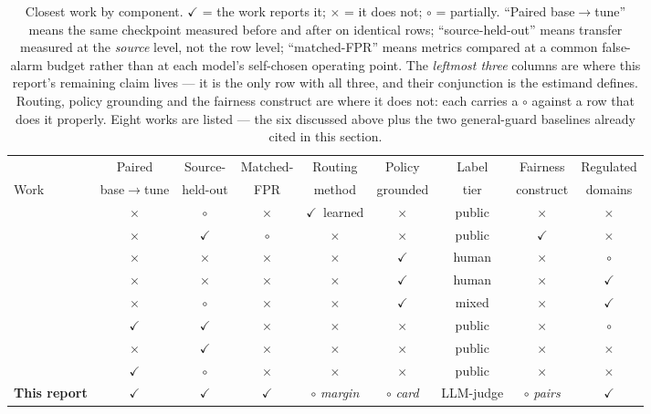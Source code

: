 \documentclass[11pt]{article}
\newcommand{\cmark}{\textcolor{tkgreenedge}{\ensuremath{\checkmark}}}
\newcommand{\xmark}{\textcolor{black!45}{\ensuremath{\times}}}
\begin{document}
\begin{table}[htbp]\centering\scriptsize
\caption{Closest work by component. \cmark{} = the work reports it; \xmark{} = it does not;
$\circ$ = partially. ``Paired base$\to$tune'' means the same checkpoint measured before and after on
identical rows; ``source-held-out'' means transfer measured at the \emph{source} level, not the row
level; ``matched-FPR'' means metrics compared at a common false-alarm budget rather than at each
model's self-chosen operating point. The \emph{leftmost three} columns are where this report's
remaining claim lives --- it is the only row with all three, and their conjunction is the estimand
 defines. Routing, policy grounding and the fairness construct are where it does not:
each carries a $\circ$ against a row that does it properly. Eight works are listed --- the six
discussed above plus the two general-guard baselines already cited in this section.}
\label{tab:closest}
\setlength{\tabcolsep}{3.2pt}\renewcommand{\arraystretch}{1.12}
\begin{tabular}{@{}>{\raggedright\arraybackslash}p{}cccccccc@{}}
\toprule
& Paired & Source- & Matched- & Routing & Policy & Label & Fairness & Regulated \\
Work & base$\to$tune & held-out & FPR & method & grounded & tier & construct & domains \\
\midrule
\citet{lee2025saferoute} & \xmark & $\circ$ & \xmark & \cmark\ learned & \xmark & public & \xmark & \xmark \\
\citet{achara2025watchdogs} & \xmark & \cmark & $\circ$ & \xmark & \xmark & public & \cmark & \xmark \\
\citet{cisnerosvelarde2026policy} & \xmark & \xmark & \xmark & \xmark & \cmark & human & \xmark & $\circ$ \\
\citet{choi2026compass} & \xmark & \xmark & \xmark & \xmark & \cmark & human & \xmark & \cmark \\
\citet{zhao2026mlbenchguard} & \xmark & $\circ$ & \xmark & \xmark & \cmark & mixed & \xmark & \cmark \\
\citet{hossain2026safetygeometry} & \cmark & \cmark & \xmark & \xmark & \xmark & public & \xmark & $\circ$ \\
\citet{elesedy2024loraguard} & \xmark & \cmark & \xmark & \xmark & \xmark & public & \xmark & \xmark \\
\citet{hsiung2025guardrails} & \cmark & $\circ$ & \xmark & \xmark & \xmark & public & \xmark & \xmark \\
\midrule
\textbf{This report} & \cmark & \cmark & \cmark & $\circ$ \emph{margin} & $\circ$ \emph{card} & LLM-judge & $\circ$ \emph{pairs} & \cmark \\

\end{tabular}
\end{table}
\end{document}
